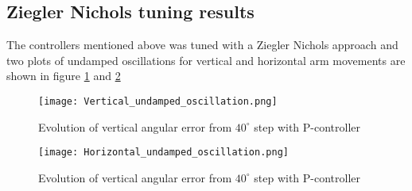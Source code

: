 \subsection{Ziegler Nichols tuning results}
The controllers mentioned above was tuned with a Ziegler Nichols approach and two plots of undamped oscillations for vertical and horizontal arm movements are shown in figure \ref{vert_osc} and \ref{Hor_osc}
\begin{figure}[H]
\centering
\texttt{[image: Vertical\_undamped\_oscillation.png]}
\caption{Evolution of vertical angular error from \(40^{\circ}\) step with P-controller}
\label{vert_osc}
\end{figure}
\begin{figure}[H]
\centering
\texttt{[image: Horizontal\_undamped\_oscillation.png]}
\caption{Evolution of vertical angular error from \(40^{\circ}\) step with P-controller}
\label{Hor_osc}
\end{figure}
